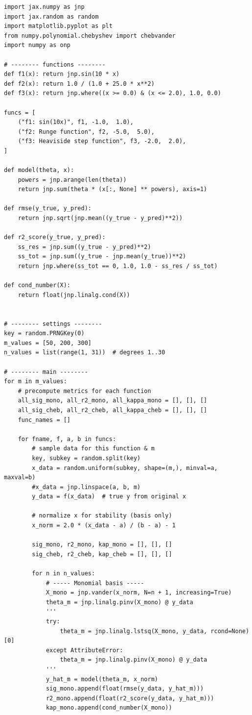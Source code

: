 \documentclass[a4paper,12pt]{article}
\begin{document}
\begin{lstlisting}
import jax.numpy as jnp
import jax.random as random
import matplotlib.pyplot as plt
from numpy.polynomial.chebyshev import chebvander
import numpy as onp

# -------- functions --------
def f1(x): return jnp.sin(10 * x)
def f2(x): return 1.0 / (1.0 + 25.0 * x**2)
def f3(x): return jnp.where((x >= 0.0) & (x <= 2.0), 1.0, 0.0)

funcs = [
    ("f1: sin(10x)", f1, -1.0,  1.0),
    ("f2: Runge function", f2, -5.0,  5.0),
    ("f3: Heaviside step function", f3, -2.0,  2.0),
]

def model(theta, x):
    powers = jnp.arange(len(theta))
    return jnp.sum(theta * (x[:, None] ** powers), axis=1)

def rmse(y_true, y_pred):
    return jnp.sqrt(jnp.mean((y_true - y_pred)**2))

def r2_score(y_true, y_pred):
    ss_res = jnp.sum((y_true - y_pred)**2)
    ss_tot = jnp.sum((y_true - jnp.mean(y_true))**2)
    return jnp.where(ss_tot == 0, 1.0, 1.0 - ss_res / ss_tot)

def cond_number(X):
    return float(jnp.linalg.cond(X))


# -------- settings --------
key = random.PRNGKey(0)
m_values = [50, 200, 300]
n_values = list(range(1, 31))  # degrees 1..30

# -------- main --------
for m in m_values:
    # precompute metrics for each function
    all_sig_mono, all_r2_mono, all_kappa_mono = [], [], []
    all_sig_cheb, all_r2_cheb, all_kappa_cheb = [], [], []
    func_names = []

    for fname, f, a, b in funcs:
        # sample data for this function & m
        key, subkey = random.split(key)
        x_data = random.uniform(subkey, shape=(m,), minval=a, maxval=b)
        #x_data = jnp.linspace(a, b, m)
        y_data = f(x_data)  # true y from original x

        # normalize x for stability (basis only)
        x_norm = 2.0 * (x_data - a) / (b - a) - 1

        sig_mono, r2_mono, kap_mono = [], [], []
        sig_cheb, r2_cheb, kap_cheb = [], [], []

        for n in n_values:
            # ----- Monomial basis -----
            X_mono = jnp.vander(x_norm, N=n + 1, increasing=True)
            theta_m = jnp.linalg.pinv(X_mono) @ y_data
            '''
            try:
                theta_m = jnp.linalg.lstsq(X_mono, y_data, rcond=None)[0]
            except AttributeError:
                theta_m = jnp.linalg.pinv(X_mono) @ y_data
            '''
            y_hat_m = model(theta_m, x_norm)
            sig_mono.append(float(rmse(y_data, y_hat_m)))
            r2_mono.append(float(r2_score(y_data, y_hat_m)))
            kap_mono.append(cond_number(X_mono))



\end{lstlisting}
\end{document}
